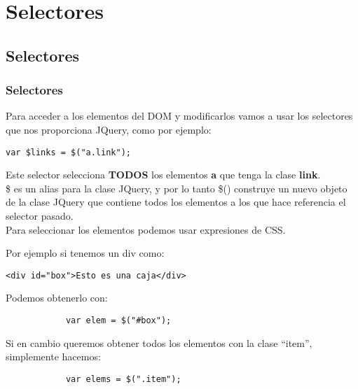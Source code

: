 \documentclass[10pt]{beamer}
\begin{document}
\section{Selectores}
\subsection{Selectores}
\begin{frame}[fragile]
	\frametitle{Selectores}
	
	\pause Para acceder a los elementos del DOM y modificarlos vamos a usar los selectores que nos proporciona
			 JQuery, como por ejemplo:
	
	\pause \begin{lstlisting}[html]
			var $links = $("a.link");
		\end{lstlisting}
		
	\pause Este selector selecciona \textbf{TODOS} los elementos \textbf{a} que tenga la clase \textbf{link}. \\
	
	\pause \$ es un alias para la clase JQuery, y por lo tanto \$() construye un nuevo objeto de la clase JQuery
			 que contiene todos los elementos a los que hace referencia el selector pasado.\\
	
	\pause Para seleccionar los elementos podemos usar expresiones de CSS.
	
	\pause Por ejemplo si tenemos un div como:
	\pause \begin{lstlisting}[html]
			<div id="box">Esto es una caja</div>
		\end{lstlisting}
		
	\pause Podemos obtenerlo con:
	\pause \begin{lstlisting}
			var elem = $("#box");
		\end{lstlisting}
	
	\pause Si en cambio queremos obtener todos los elementos con la clase ``item'', simplemente hacemos:
	
	\pause \begin{lstlisting}
			var elems = $(".item");
		\end{lstlisting}
\end{frame}
\end{document}
